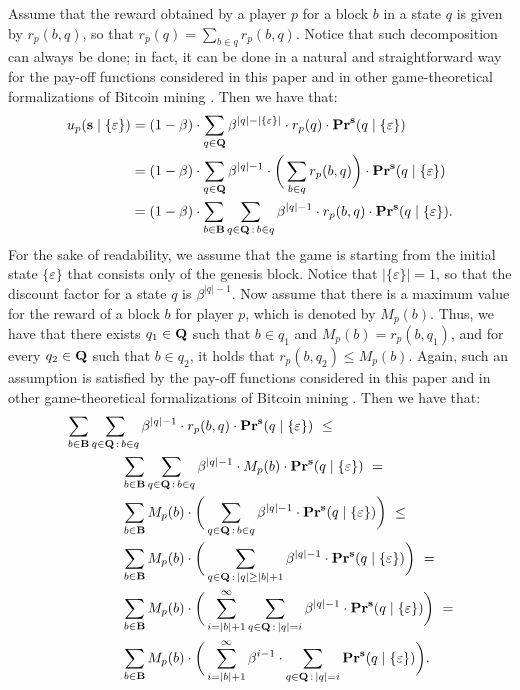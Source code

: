 Assume that the reward obtained by a player $p$ for a block $b$ in a state $q$ is given by $r_p(b,q)$, so that $r_p(q) = \sum_{b \in q} r_p(b,q)$. Notice that such decomposition can always be done; in fact, it can be done in a natural and straightforward way for the pay-off functions considered in this paper and in other game-theoretical formalizations of Bitcoin mining \cite{mininggames:2016}. Then we have that:
\begin{align*}
u_p(\mathbf{s} \mid \{\varepsilon\}) & =  (1 - \beta) \cdot  \sum_{q \in \mathbf{Q}} \beta^{|q|-|\{\varepsilon\}|} \cdot  r_p(q) \cdot \mathbf{Pr}^{\mathbf{s}}(q \mid \{\varepsilon\})\\
& =  (1 - \beta) \cdot \sum_{q \in \mathbf{Q}} \beta^{|q|-1} \cdot  \bigg(\sum_{b \in q} r_p(b,q) \bigg) \cdot \mathbf{Pr}^{\mathbf{s}}(q \mid \{\varepsilon\})\\
& = (1 - \beta) \cdot \sum_{b \in \mathbf{B}} \sum_{q \in \mathbf{Q} \,:\, b \in q} \beta^{|q|-1} \cdot r_p(b,q) \cdot \mathbf{Pr}^{\mathbf{s}}(q \mid \{\varepsilon\}).
\end{align*}
For the sake of readability, we assume that the game is starting from the initial state $\{\varepsilon\}$ that consists only of the genesis block. Notice that $|\{\varepsilon\}| = 1$, so that the discount factor for a state $q$ is $\beta^{|q|-1}$. Now assume that there is a maximum value for the reward of a block $b$ for player $p$, which is denoted by $M_p(b)$. Thus, we have that there exists $q_1 \in \mathbf{Q}$ such that $b \in q_1$ and $M_p(b) = r_p(b,q_1)$, and for every $q_2 \in \mathbf{Q}$ such that $b \in q_2$, it holds that $r_p(b,q_2) \leq M_p(b)$. Again, such an assumption is satisfied by the pay-off functions considered in this paper and in other game-theoretical formalizations of Bitcoin mining \cite{mininggames:2016}. Then we have that:
\begin{align*}
&\sum_{b \in \mathbf{B}} \sum_{q \in \mathbf{Q} \,:\, b \in q} \beta^{|q|-1} \cdot r_p(b,q) \cdot \mathbf{Pr}^{\mathbf{s}}(q \mid \{\varepsilon\})
\ \leq \\  
&\hspace{40pt}  \sum_{b \in \mathbf{B}} \sum_{q \in \mathbf{Q} \,:\, b \in q} \beta^{|q|-1} \cdot M_p(b) \cdot \mathbf{Pr}^{\mathbf{s}}(q \mid \{\varepsilon\}) \ =\\
&\hspace{40pt}  \sum_{b \in \mathbf{B}} M_p(b) \cdot\bigg(\sum_{q \in \mathbf{Q} \,:\, b \in q} \beta^{|q|-1}  \cdot \mathbf{Pr}^{\mathbf{s}}(q \mid \{\varepsilon\})\bigg) \ \leq\\
&\hspace{40pt}  \sum_{b \in \mathbf{B}} M_p(b) \cdot\bigg(\sum_{q \in \mathbf{Q} \,:\, |q| \geq |b|+1} \beta^{|q|-1}  \cdot \mathbf{Pr}^{\mathbf{s}}(q \mid \{\varepsilon\})\bigg) \ = \\
&\hspace{40pt}  \sum_{b \in \mathbf{B}} M_p(b) \cdot\bigg(\sum_{i=|b|+1}^\infty \sum_{q \in \mathbf{Q} \,:\, |q| = i} \beta^{|q|-1}  \cdot \mathbf{Pr}^{\mathbf{s}}(q \mid \{\varepsilon\})\bigg) \ = \\
&\hspace{40pt}  \sum_{b \in \mathbf{B}} M_p(b) \cdot\bigg(\sum_{i=|b|+1}^\infty \beta^{i-1} \cdot \sum_{q \in \mathbf{Q} \,:\, |q| = i} \mathbf{Pr}^{\mathbf{s}}(q \mid \{\varepsilon\})\bigg).
\end{align*}
